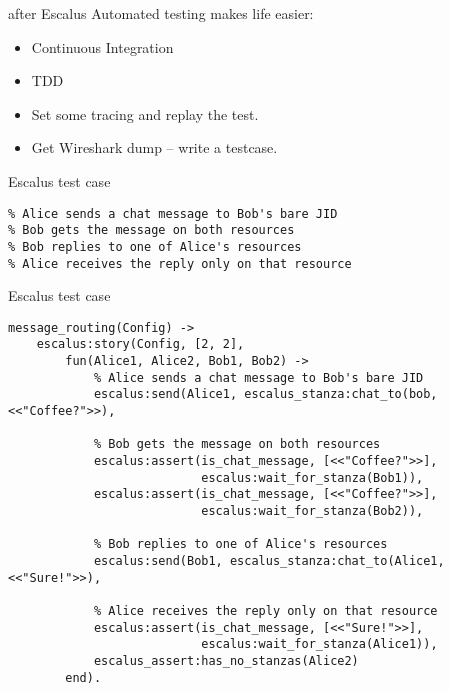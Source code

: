 \documentclass[17pt]{beamer}
\begin{document}
\begin{frame}{after Escalus}
Automated testing makes life easier:
\begin{itemize}
\item Continuous Integration
\item TDD
\item Set some tracing and replay the test.
\item Get Wireshark dump -- write a testcase.
\end{itemize}
\end{frame}

\begin{frame}[fragile]{Escalus test case}
\begin{verbatim}
% Alice sends a chat message to Bob's bare JID
% Bob gets the message on both resources
% Bob replies to one of Alice's resources
% Alice receives the reply only on that resource
\end{verbatim}
\end{frame}

\begin{frame}[fragile]{Escalus test case}
\begin{verbatim}
message_routing(Config) ->
    escalus:story(Config, [2, 2],
        fun(Alice1, Alice2, Bob1, Bob2) ->
            % Alice sends a chat message to Bob's bare JID
            escalus:send(Alice1, escalus_stanza:chat_to(bob, <<"Coffee?">>),

            % Bob gets the message on both resources
            escalus:assert(is_chat_message, [<<"Coffee?">>],
                           escalus:wait_for_stanza(Bob1)),
            escalus:assert(is_chat_message, [<<"Coffee?">>],
                           escalus:wait_for_stanza(Bob2)),

            % Bob replies to one of Alice's resources
            escalus:send(Bob1, escalus_stanza:chat_to(Alice1, <<"Sure!">>),

            % Alice receives the reply only on that resource
            escalus:assert(is_chat_message, [<<"Sure!">>],
                           escalus:wait_for_stanza(Alice1)),
            escalus_assert:has_no_stanzas(Alice2)
        end).
\end{verbatim}
\end{frame}
\end{document}
